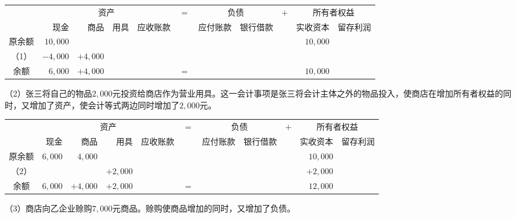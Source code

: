 		\begin{table}[h!]
			\centering
			\begin{tabular}{c*{10}{r}}
							 & \multicolumn{4}{c}{资产}& \multirow{2}{*}{$=$} & \multicolumn{2}{c}{负债} & \multirow{2}{*}{$+$} & \multicolumn{2}{c}{所有者权益} \\
				\cline{2-5} \cline{7-8} \cline{10-11}
							 & 现金 & 商品 & 用具 & 应收账款 & & 应付账款 & 银行借款 & & 实收资本 & 留存利润 \\ 
				原余额 & $10,000$ & \multicolumn{7}{c}{} & $10,000$ &  \\
				（1）  & $-4,000$ & $+4,000$ \\
				\cline{2-5} \cline{7-8} \cline{10-11}
				余额   & $6,000$ & $+4,000$ & \multicolumn{2}{c}{} & $=$ & \multicolumn{3}{c}{} & $10,000$ & \\
			\end{tabular}
		\end{table}

		（2）张三将自己的物品$2,000$元投资给商店作为营业用具。这一会计事项是张三将会计主体之外的物品投入，使商店在增加所有者权益的同时，又增加了资产，使会计等式两边同时增加了$2,000$元。

		\begin{table}[!ht]
			\centering
			\begin{tabular}{c*{10}{r}}
							 & \multicolumn{4}{c}{资产}& \multirow{2}{*}{$=$} & \multicolumn{2}{c}{负债} & \multirow{2}{*}{$+$} & \multicolumn{2}{c}{所有者权益} \\
				\cline{2-5} \cline{7-8} \cline{10-11}
							 & 现金 & 商品 & 用具 & 应收账款 & & 应付账款 & 银行借款 & & 实收资本 & 留存利润 \\ 
				原余额 & $6,000$ & $4,000$ & \multicolumn{6}{c}{} & $10,000$  \\
				（2） & \multicolumn{2}{c}{} & $+2,000$ & \multicolumn{5}{c}{} & $+2,000$  \\
				\cline{2-5} \cline{7-8} \cline{10-11}
				余额   & $6,000$ & $+4,000$ & $+2,000$ & & $=$ & \multicolumn{3}{c}{} & $12,000$   \\
			\end{tabular}
		\end{table}

		（3）商店向乙企业赊购$7,000$元商品。赊购使商品增加的同时，又增加了负债。

